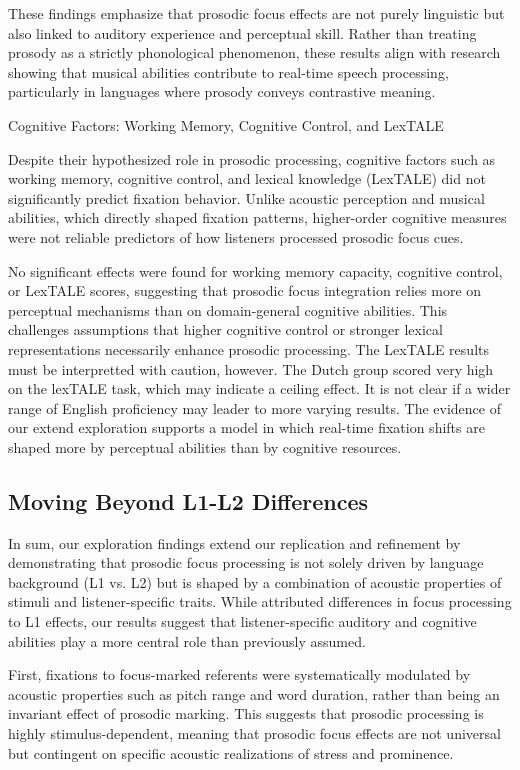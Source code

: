 These findings emphasize that prosodic focus effects are not purely linguistic but also linked to auditory experience and perceptual skill. Rather than treating prosody as a strictly phonological phenomenon, these results align with research showing that musical abilities contribute to real-time speech processing, particularly in languages where prosody conveys contrastive meaning.

Cognitive Factors: Working Memory, Cognitive Control, and LexTALE

Despite their hypothesized role in prosodic processing, cognitive factors such as working memory, cognitive control, and lexical knowledge (LexTALE) did not significantly predict fixation behavior. Unlike acoustic perception and musical abilities, which directly shaped fixation patterns, higher-order cognitive measures were not reliable predictors of how listeners processed prosodic focus cues.

No significant effects were found for working memory capacity, cognitive control, or LexTALE scores, suggesting that prosodic focus integration relies more on perceptual mechanisms than on domain-general cognitive abilities. This challenges assumptions that higher cognitive control or stronger lexical representations necessarily enhance prosodic processing. The LexTALE results must be interpretted with caution, however. The Dutch group scored very high on the lexTALE task, which may indicate a ceiling effect. It is not clear if a wider range of English proficiency may leader to more varying results. The evidence of our extend exploration supports a model in which real-time fixation shifts are shaped more by perceptual abilities than by cognitive resources.


\subsection{Moving Beyond L1-L2 Differences}

In sum, our exploration findings extend our replication and refinement by demonstrating that prosodic focus processing is not solely driven by language background (L1 vs. L2) but is shaped by a combination of acoustic properties of stimuli and listener-specific traits. While \citep{Ge2021} attributed differences in focus processing to L1 effects, our results suggest that listener-specific auditory and cognitive abilities play a more central role than previously assumed.

First, fixations to focus-marked referents were systematically modulated by acoustic properties such as pitch range and word duration, rather than being an invariant effect of prosodic marking. This suggests that prosodic processing is highly stimulus-dependent, meaning that prosodic focus effects are not universal but contingent on specific acoustic realizations of stress and prominence.

